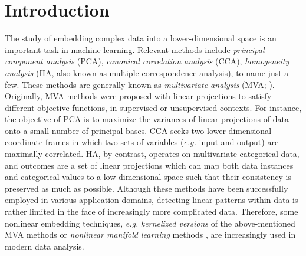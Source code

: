 \documentclass[a4paper]{article}
\begin{document}
\section{Introduction}
\label{sec:introduction}
The study of embedding complex data into a lower-dimensional space is an important task in machine learning.  
Relevant methods include \emph{principal component analysis} (PCA), \emph{canonical correlation analysis} (CCA), \emph{homogeneity analysis} (HA, also known as multiple correspondence 
analysis), to name just a few.  These methods are generally known as \emph{multivariate analysis} (MVA; \citeauthor{MVA_book} \citeyear{MVA_book}).   
Originally, MVA methods were proposed with linear projections to satisfy different objective functions, in supervised or unsupervised contexts. For instance, the objective of PCA is 
to maximize the variances of linear projections of data onto a small number of principal bases.
CCA seeks two lower-dimensional coordinate frames in which two sets of variables (\emph{e.g.} input and output) are maximally correlated. HA, by contrast, operates 
on multivariate categorical data, and outcomes are a set of linear projections which can map both data instances and categorical values to a low-dimensional space such 
that their consistency is preserved as much as possible.                  
Although these methods have been successfully employed in various application domains, detecting linear patterns within data is rather limited in the face of
increasingly more complicated data. Therefore, some nonlinear embedding techniques, \emph{e.g.} \emph{kernelized versions} 
of the above-mentioned MVA methods or \emph{nonlinear manifold learning} methods \cite{Manifold_Learning}, 
are increasingly used in modern data analysis.  
\end{document}
